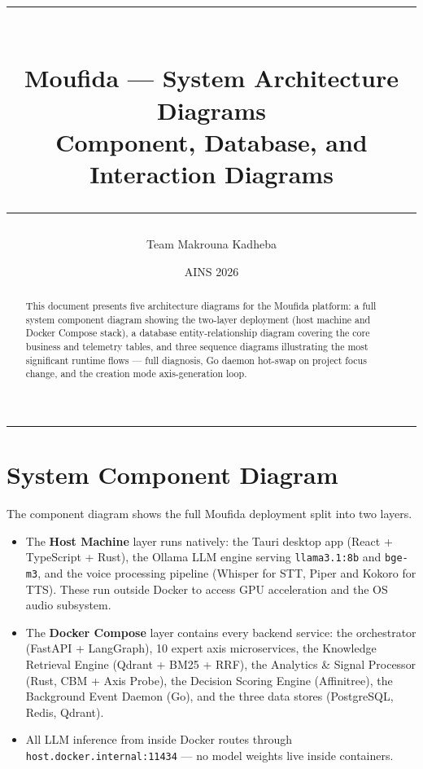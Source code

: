 \documentclass[11pt,a4paper]{article}
\title{%
  {\color{ArchNavy}\rule{\linewidth}{1.5pt}}\\[6pt]
  \textbf{\Large Moufida --- System Architecture Diagrams}\\[4pt]
  {\normalsize Component, Database, and Interaction Diagrams}\\[6pt]
  {\color{ArchNavy}\rule{\linewidth}{0.8pt}}
}
\author{Team Makrouna Kadheba}
\date{AINS 2026}
\begin{document}
\maketitle\thispagestyle{empty}

\begin{abstract}\small
  This document presents five architecture diagrams for the Moufida platform:
  a full system component diagram showing the two-layer deployment (host machine and
  Docker Compose stack), a database entity-relationship diagram covering the core business
  and telemetry tables, and three sequence diagrams illustrating the most significant
  runtime flows --- full diagnosis, Go daemon hot-swap on project focus change, and the
  creation mode axis-generation loop.
\end{abstract}

\tableofcontents
\vspace{6pt}
\noindent\color{ArchNavy}\rule{\linewidth}{0.4pt}

\section{System Component Diagram}

\begin{descbox}
  The component diagram shows the full Moufida deployment split into two layers.
  \begin{itemize}
    \item The \textbf{Host Machine} layer runs natively: the Tauri desktop app
          (React + TypeScript + Rust), the Ollama LLM engine serving
          \texttt{llama3.1:8b} and \texttt{bge-m3}, and the voice processing pipeline
          (Whisper for STT, Piper and Kokoro for TTS). These run outside Docker to
          access GPU acceleration and the OS audio subsystem.
    \item The \textbf{Docker Compose} layer contains every backend service: the
          orchestrator (FastAPI + LangGraph), 10 expert axis microservices, the
          Knowledge Retrieval Engine (Qdrant + BM25 + RRF), the Analytics \& Signal
          Processor (Rust, CBM + Axis Probe), the Decision Scoring Engine (Affinitree),
          the Background Event Daemon (Go), and the three data stores
          (PostgreSQL, Redis, Qdrant).
    \item All LLM inference from inside Docker routes through
          \texttt{host.docker.internal:11434} --- no model weights live inside containers.
  \end{itemize}
\end{descbox}
\end{document}

